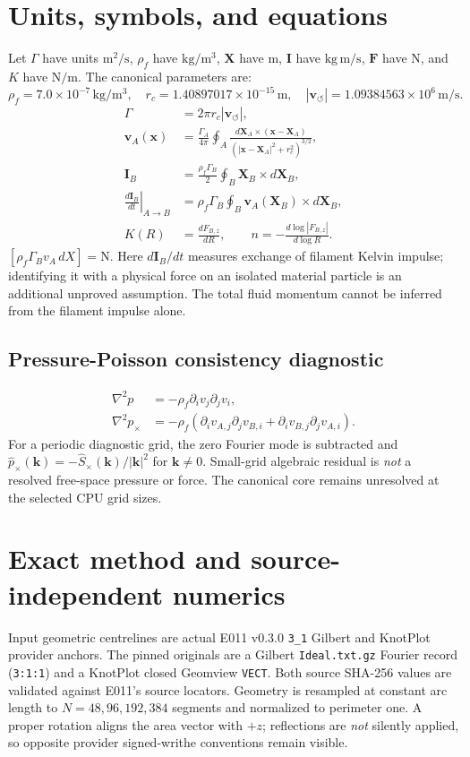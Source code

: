 \documentclass[11pt,a4paper]{article}
\newcommand{\vswirl}{\mathbf{v}_{\!\boldsymbol{\circlearrowleft}}}
\newcommand{\rhoF}{\rho_{\!f}}
\newcommand{\rc}{r_c}
\begin{document}
\section{Units, symbols, and equations}
Let $\Gamma$ have units $\mathrm{m^2/s}$, $\rhoF$ have $\mathrm{kg/m^3}$, $\mathbf{X}$ have $\mathrm m$, $\mathbf{I}$ have $\mathrm{kg\,m/s}$, $\mathbf{F}$ have $\mathrm N$, and $K$ have $\mathrm{N/m}$. The canonical parameters are:
\[\rhoF=7.0\times 10^{-7}\,\mathrm{kg/m^3},\quad \rc=1.40897017\times10^{-15}\,\mathrm m,\quad |\vswirl|=1.09384563\times10^6\,\mathrm{m/s}.\]
\begin{align}
\Gamma&=2\pi\rc|\vswirl|,\\
\mathbf v_A(\mathbf x)&=\frac{\Gamma_A}{4\pi}\oint_A\frac{d\mathbf X_A\times(\mathbf x-\mathbf X_A)}{(|\mathbf x-\mathbf X_A|^2+\rc^2)^{3/2}},\\
\mathbf I_B&=\frac{\rhoF\Gamma_B}{2}\oint_B\mathbf X_B\times d\mathbf X_B,\\
\left.\frac{d\mathbf I_B}{dt}\right|_{A\to B}&=\rhoF\Gamma_B\oint_B\mathbf v_A(\mathbf X_B)\times d\mathbf X_B,\\
K(R)&=\frac{dF_{B,z}}{dR},\qquad n=-\frac{d\log|F_{B,z}|}{d\log R}.
\end{align}
$[\rhoF\Gamma_B v_A\,dX]=\mathrm N$. Here $d\mathbf I_B/dt$ measures exchange of filament Kelvin impulse; identifying it with a physical force on an isolated material particle is an additional unproved assumption. The total fluid momentum cannot be inferred from the filament impulse alone.
\subsection{Pressure-Poisson consistency diagnostic}
\begin{align}
\nabla^2p&=-\rhoF\partial_i v_j\partial_j v_i,\\
\nabla^2 p_{\times}&=-\rhoF(\partial_i v_{A,j}\partial_j v_{B,i}+\partial_i v_{B,j}\partial_j v_{A,i}).
\end{align}
For a periodic diagnostic grid, the zero Fourier mode is subtracted and $\widehat p_{\times}(\mathbf k)=-\widehat S_{\times}(\mathbf k)/|\mathbf k|^2$ for $\mathbf k\neq0$. Small-grid algebraic residual is \emph{not} a resolved free-space pressure or force. The canonical core remains unresolved at the selected CPU grid sizes.
\section{Exact method and source-independent numerics}
Input geometric centrelines are actual E011 v0.3.0 \texttt{3\_1} Gilbert and KnotPlot provider anchors. The pinned originals are a Gilbert \texttt{Ideal.txt.gz} Fourier record (\texttt{3:1:1}) and a KnotPlot closed Geomview \texttt{VECT}. Both source SHA-256 values are validated against E011's source locators. Geometry is resampled at constant arc length to $N=48,96,192,384$ segments and normalized to perimeter one. A proper rotation aligns the area vector with $+z$; reflections are \emph{not} silently applied, so opposite provider signed-writhe conventions remain visible.
\end{document}
